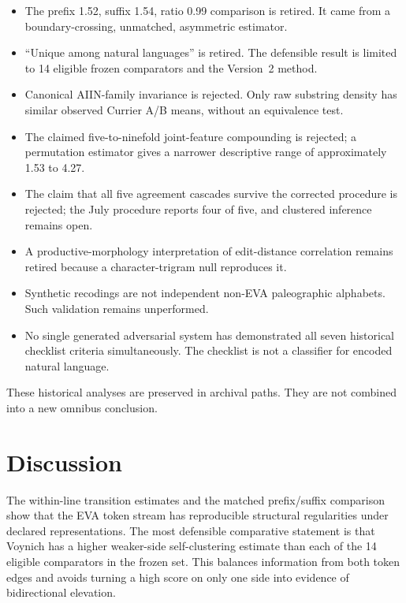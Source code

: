\documentclass[11pt]{article}
\begin{document}
\begin{itemize}
  \item The prefix 1.52, suffix 1.54, ratio 0.99 comparison is retired. It
        came from a boundary-crossing, unmatched, asymmetric estimator.
  \item ``Unique among natural languages'' is retired. The defensible result
        is limited to 14 eligible frozen comparators and the Version~2 method.
  \item Canonical AIIN-family invariance is rejected. Only raw substring
        density has similar observed Currier A/B means, without an equivalence
        test.
  \item The claimed five-to-ninefold joint-feature compounding is rejected;
        a permutation estimator gives a narrower descriptive range of
        approximately 1.53 to 4.27.
  \item The claim that all five agreement cascades survive the corrected
        procedure is rejected; the July procedure reports four of five, and
        clustered inference remains open.
  \item A productive-morphology interpretation of edit-distance correlation
        remains retired because a character-trigram null reproduces it.
  \item Synthetic recodings are not independent non-EVA paleographic
        alphabets. Such validation remains unperformed.
  \item No single generated adversarial system has demonstrated all seven
        historical checklist criteria simultaneously. The checklist is not a
        classifier for encoded natural language.
\end{itemize}

These historical analyses are preserved in archival paths. They are not
combined into a new omnibus conclusion.

\section{Discussion}

The within-line transition estimates and the matched prefix/suffix comparison
show that the EVA token stream has reproducible structural regularities under
declared representations. The most defensible comparative statement is that
Voynich has a higher weaker-side self-clustering estimate than each of the 14
eligible comparators in the frozen set. This balances information from both
token edges and avoids turning a high score on only one side into evidence of
bidirectional elevation.
\end{document}
